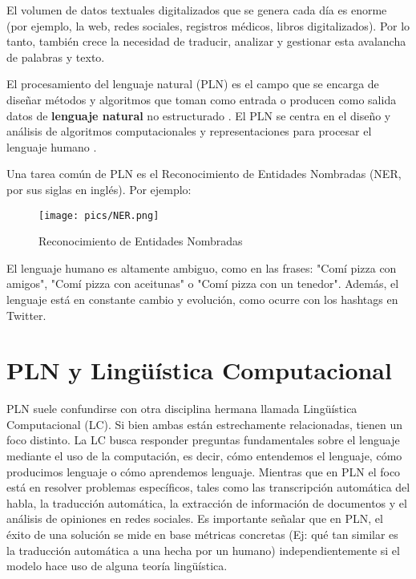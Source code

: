 

El volumen de datos textuales digitalizados que se genera cada día es enorme (por ejemplo, la web, redes sociales, registros médicos, libros digitalizados). Por lo tanto, también crece la necesidad de traducir, analizar y gestionar esta avalancha de palabras y texto.

El procesamiento del lenguaje natural (PLN) es el campo que se encarga de diseñar métodos y algoritmos que toman como entrada o producen como salida datos de \textbf{lenguaje natural} no estructurado \cite{goldberg2017neural}. El PLN se centra en el diseño y análisis de algoritmos computacionales y representaciones para procesar el lenguaje humano \cite{jacobbook}.





Una tarea común de PLN es el Reconocimiento de Entidades Nombradas (NER, por sus siglas en inglés). Por ejemplo:

\begin{figure}[h]
	\texttt{[image: pics/NER.png]}
	\caption{Reconocimiento de Entidades Nombradas}
\end{figure}

El lenguaje humano es altamente ambiguo, como en las frases: "Comí pizza con amigos", "Comí pizza con aceitunas" o "Comí pizza con un tenedor". Además, el lenguaje está en constante cambio y evolución, como ocurre con los hashtags en Twitter.

\section{PLN y Lingüística Computacional}
PLN suele confundirse con otra disciplina hermana llamada Lingüística Computacional (LC). Si bien ambas están estrechamente relacionadas, tienen un foco distinto. La LC busca responder preguntas fundamentales sobre el lenguaje mediante el uso de la computación, es decir, cómo entendemos el lenguaje, cómo producimos lenguaje o cómo aprendemos lenguaje. Mientras que en PLN el foco está en resolver problemas específicos, tales como las transcripción automática del habla, la traducción automática, la extracción de información de documentos y el análisis de opiniones en redes sociales. Es importante señalar que en PLN, el éxito de una solución se mide en base métricas concretas (Ej: qué tan similar es la traducción automática a una hecha por un humano) independientemente si el modelo hace uso de alguna teoría lingüística.



